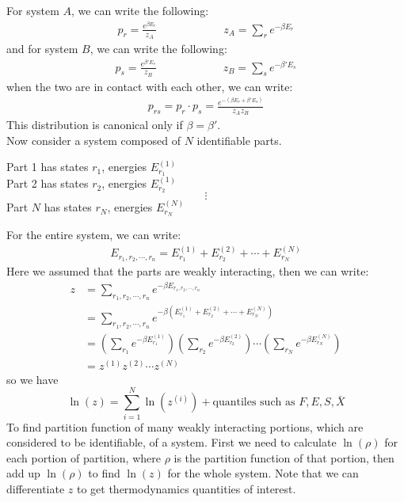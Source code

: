 \documentclass[11pt,oneside]{book}
\theoremstyle{break}
\theoremstyle{break}
\begin{document}
For system $A$, we can write the following:
\begin{align*}
p_r = \frac{e^{\beta E_r}}{z_A} \qquad \qquad \qquad z_A = \sum_r e^{-\beta E_r}
\end{align*}
and for system $B$, we can write the following:
\begin{align*}
p_s = \frac{e^{\beta' E_s}}{z_B} \qquad \qquad \qquad z_B = \sum_s e^{-\beta' E_s}
\end{align*}
when the two are in contact with each other, we can write:
\begin{align*}
p_{rs} = p_r \cdot p_s = \frac{e^{-(\beta E_r + \beta' E_s)}}{z_A z_B}
\end{align*}
This distribution is canonical only if $\beta = \beta'$.\\ 

Now consider a system composed of $N$ identifiable parts.
\begin{center}
Part 1 has states $r_1$, energies $E^{(1)}_{r_1}$\\
Part 2 has states $r_2$, energies $E^{(1)}_{r_2}$
$$\vdots$$
Part $N$ has states $r_N$, energies $E^{(N)}_{r_N}$
\end{center}

For the entire system, we can write:
\begin{align*}
E_{r_1,r_2,\cdots, r_n} = E_{r_1}^{(1)}+E_{r_2}^{(2)}+\cdots + E_{r_N}^{(N)} 
\end{align*}
Here we assumed that the parts are weakly interacting, then we can write:
\begin{align*}
z &= \sum_{r_1,r_2,\cdots, r_n} e^{-\beta E_{r_1,r_2,\cdots, r_n}}\\
&= \sum_{r_1,r_2,\cdots, r_n} e^{-\beta \left( E_{r_1}^{(1)}+E_{r_2}^{(2)}+\cdots + E_{r_N}^{(N)}  \right)}\\
&= \left( \sum_{r_1} e^{-\beta E_{r_1}^{(1)}}\right)\left( \sum_{r_2} e^{-\beta E_{r_2}^{(2)}}\right)\cdots \left( \sum_{r_N} e^{-\beta E_{r_N}^{(N)}}\right)\\
&= z^{(1)} z^{(2)}\cdots z^{(N)}
\end{align*}
so we have 
$$\ln(z) = \sum_{i=1}^N \ln (z^{(i)}) + \text{quantiles such as }F, E, S, \bar{X}$$
\hfill\break
To find partition function of many weakly interacting portions, which are considered to be identifiable, of a system. First we need to calculate $\ln(\rho)$ for each portion of partition, where $\rho$ is the partition function of that portion, then add up $\ln(\rho)$ to find $\ln(z)$ for the whole system. Note that we can differentiate $z$ to get thermodynamics quantities of interest. \\
\end{document}
